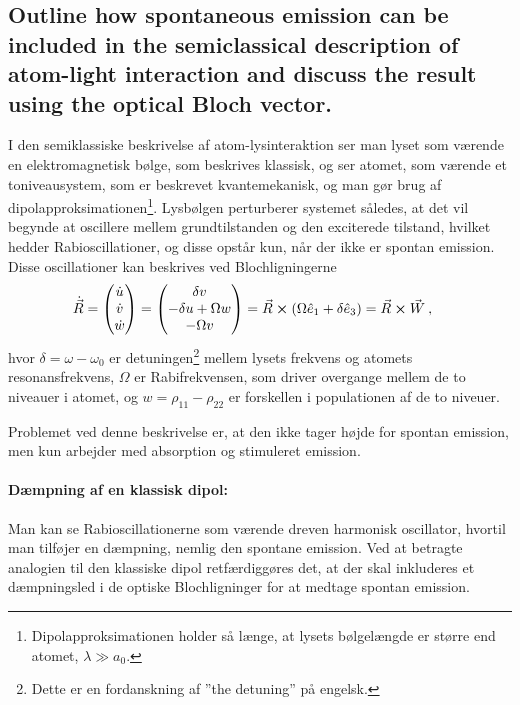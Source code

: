 \subsection{Outline how spontaneous emission can be included in the semiclassical description of atom-light interaction and discuss the result using the optical Bloch vector.}


I den semiklassiske beskrivelse af atom-lysinteraktion ser man lyset som værende en elektromagnetisk bølge, som beskrives klassisk, og ser atomet, som værende et toniveausystem, som er beskrevet kvantemekanisk, og man gør brug af dipolapproksimationen\footnote{Dipolapproksimationen holder så længe, at lysets bølgelængde er større end atomet, $\lambda \gg a_0$.}. Lysbølgen perturberer systemet således, at det vil begynde at oscillere mellem grundtilstanden og den exciterede tilstand, hvilket hedder \textsf{Rabioscillationer}, og disse opstår kun, når der ikke er spontan emission. Disse oscillationer kan beskrives ved Blochligningerne
\begin{align}
    \Dot{\Vec{R}} &=
        \begin{pmatrix}
            \Dot{u} \\
            \Dot{v} \\
            \Dot{w}
        \end{pmatrix}
    =
        \begin{pmatrix}
            \delta v \\
            -\delta u + \Omega w \\
            -\Omega v
        \end{pmatrix}
    = \Vec{R} \cross \left(\Omega\Hat{e}_1 + \delta\Hat{e}_3\right)
    = \Vec{R} \cross \Vec{W} \: ,
\end{align}
hvor $\delta = \omega - \omega_0$ er detuningen\footnote{Dette er en fordanskning af ''the detuning'' på engelsk.} mellem lysets frekvens og atomets resonansfrekvens, $\Omega$ er Rabifrekvensen, som driver overgange mellem de to niveauer i atomet, og $w = \rho_{11} - \rho_{22}$ er forskellen i populationen af de to niveuer.

Problemet ved denne beskrivelse er, at den ikke tager højde for spontan emission, men kun arbejder med absorption og stimuleret emission.


\paragraph{Dæmpning af en klassisk dipol:} Man kan se Rabioscillationerne som værende dreven harmonisk oscillator, hvortil man tilføjer en dæmpning, nemlig den spontane emission. Ved at betragte analogien til den klassiske dipol retfærdiggøres det, at der skal inkluderes et dæmpningsled i de optiske Blochligninger for at medtage spontan emission.

